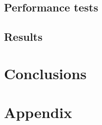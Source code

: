 \documentclass[10pt,a4paper,hidelinks]{article}
\begin{document}
\subsection{Performance tests}
\subsection{Results}

\section{Conclusions}
\section{Appendix}


\newpage
\listoffigures
\lstlistoflistings
\listoftables



\end{document}
